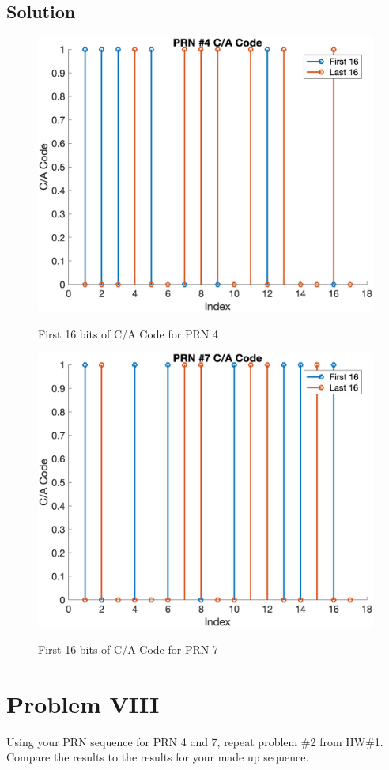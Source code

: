 \documentclass{article}
\begin{document}
\subsection*{Solution}
\begin{figure}[H]
    \centering
    \includegraphics[width=0.75\linewidth]{../figures/p7_prn4_16.png}\label{fig:p7_prn4_16}
    \caption{First 16 bits of C/A Code for PRN 4}
\end{figure}
\begin{figure}[H]
    \centering
    \includegraphics[width=0.75\linewidth]{../figures/p7_prn7_16.png}\label{fig:p7_prn7_16}
    \caption{First 16 bits of C/A Code for PRN 7}
\end{figure}

\section*{Problem VIII}
Using your PRN sequence for PRN 4 and 7, repeat problem \#2 from HW\#1. Compare the
results to the results for your made up sequence.
\end{document}
